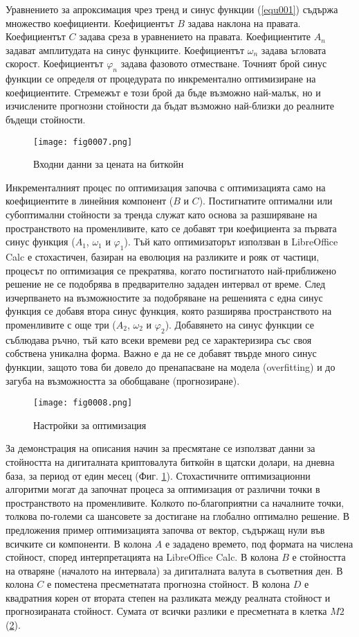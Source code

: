 Уравнението за апроксимация чрез тренд и синус функции (\ref{equ001}) съдържа множество коефициенти. Коефициентът $B$ задава наклона на правата. Коефициентът $C$ задава среза в уравнението на правата. Коефициентите $A_n$ задават амплитудата на синус функциите. Коефициентът $\omega_n$ задава ъгловата скорост. Коефициентът $\varphi_n$ задава фазовото отместване. Точният брой синус функции се определя от процедурата по инкрементално оптимизиране на коефициентите. Стремежът е този брой да бъде възможно най-малък, но и изчислените прогнозни стойности да бъдат възможно най-близки до реалните бъдещи стойности. 

\begin{figure}[H]
  \centering
  \texttt{[image: fig0007.png]}
  \caption{Входни данни за цената на биткойн}
\label{fig0007}
\end{figure}

Инкременталният процес по оптимизация започва с оптимизацията само на коефициентите в линейния компонент ($B$ и $C$). Постигнатите оптимални или субоптимални стойности за тренда служат като основа за разширяване на пространството на променливите, като се добавят три коефициента за първата синус функция ($A_1$, $\omega_1$ и $\varphi_1$). Тъй като оптимизаторът използван в LibreOffice Calc е стохастичен, базиран на еволюция на разликите и рояк от частици, процесът по оптимизация се прекратява, когато постигнатото най-приближено решение не се подобрява в предварително зададен интервал от време. След изчерпването на възможностите за подобряване на решенията с една синус функция се добавя втора синус функция, която разширява пространството на променливите с още три ($A_2$, $\omega_2$ и $\varphi_2$). Добавянето на синус функции се съблюдава ръчно, тъй като всеки времеви ред се характеризира със своя собствена уникална форма. Важно е да не се добавят твърде много синус функции, защото това би довело до пренапасване на модела (overfitting) и до загуба на възможността за обобщаване (прогнозиране).

\begin{figure}[H]
  \centering
  \texttt{[image: fig0008.png]}
  \caption{Настройки за оптимизация}
\label{fig0008}
\end{figure}

За демонстрация на описания начин за пресмятане се използват данни за стойността на дигиталната криптовалута биткойн в щатски долари, на дневна база, за период от един месец (Фиг. \ref{fig0007}). Стохастичните оптимизационни алгоритми могат да започнат процеса за оптимизация от различни точки в пространството на променливите. Колкото по-благоприятни са началните точки, толкова по-големи са шансовете за достигане на глобално оптимално решение. В предложения пример оптимизацията започва от вектор, съдържащ нули във всичките си компоненти. В колона $A$ е зададено времето, под формата на числена стойност, според интерпретацията на LibreOffice Calc. В колона $B$ е стойността на отваряне (началото на интервала) за дигиталната валута в съответния ден. В колона $C$ е поместена пресметнатата прогнозна стойност. В колона $D$ е квадратния корен от втората степен на разликата между реалната стойност и прогнозираната стойност. Сумата от всички разлики е пресметната в клетка $M2$ (\ref{fig0008}).

